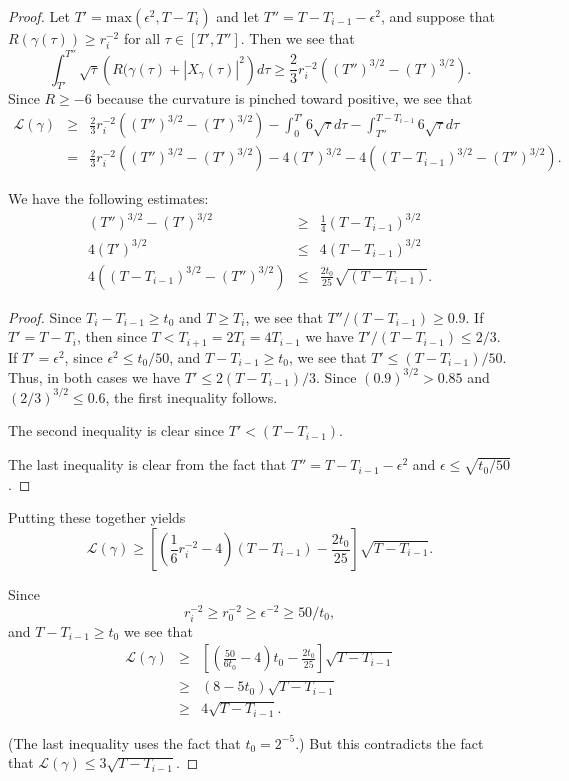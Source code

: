 \begin{proof}
Let $T'=\mathrm{max}(\epsilon^{2},T-T_i)$ and let
$T''=T-T_{i-1}-\epsilon^2$, and suppose that $R(\gamma(\tau))\ge
r_i^{-2}$ for all $\tau\in [T',T'']$. Then we see that
$$\int_{T'}^{T''}\sqrt{\tau}\left(R(\gamma(\tau)+|X_\gamma(\tau)|^2\right)d\tau
\ge \frac{2}{3}r_i^{-2}\left((T'')^{3/2}-(T')^{3/2}\right).$$ Since
$R\ge -6$ because the curvature is pinched toward positive, we see that
\begin{eqnarray*}
{\mathcal L}(\gamma) & \ge & \frac{2}{3}r_i^{-2}\left((T'')^{3/2}-(T')^{3/2}\right)-\int_0^{T'}
6\sqrt{\tau}d\tau-\int_{T''}^{T-T_{i-1}}6\sqrt{\tau}d\tau \\
& = & \frac{2}{3}r_i^{-2}\left((T'')^{3/2}-(T')^{3/2}\right)-
4(T')^{3/2}-4\left((T-T_{i-1})^{3/2}-(T'')^{3/2}\right).
\end{eqnarray*}

\begin{claim}
\label{claim:tau0-estimates} We have the following estimates:
\begin{eqnarray*}
(T'')^{3/2}-(T')^{3/2} & \ge &
\frac{1}{4}(T-T_{i-1})^{3/2} \\
4(T')^{3/2} & \le &  4(T-T_{i-1})^{3/2} \\
4\left((T-T_{i-1})^{3/2}-(T'')^{3/2}\right) & \le &
\frac{2t_0}{25}\sqrt{(T-T_{i-1})}.\end{eqnarray*}
\end{claim}

\begin{proof}
Since $T_i-T_{i-1}\ge t_0$ and $T\ge T_i$, we see that
$T''/(T-T_{i-1})\ge 0.9$. If $T'=T-T_i$, then since
$T<T_{i+1}=2T_i=4T_{i-1}$ we have $T'/(T-T_{i-1})\le 2/3$. If
$T'=\epsilon^2$, since $\epsilon^2\le t_0/50$, and $T-T_{i-1}\ge
t_0$, we see that $T'\le (T-T_{i-1})/50$. Thus, in both cases we
have $T'\le 2(T-T_{i-1})/3$. Since $(0.9)^{3/2}>0.85$ and
$(2/3)^{3/2}\le 0.6$, the first inequality follows.

The second inequality is clear since $T'<(T-T_{i-1})$.

The last inequality is clear from the fact that
$T''=T-T_{i-1}-\epsilon^2$ and $\epsilon\le \sqrt{t_0/50}$.
\end{proof}




 Putting these together yields
 $${\mathcal L}(\gamma)\ge
 \left[\left(\frac{1}{6}r_i^{-2}-4\right)\left(T-T_{i-1}\right)-\frac{2t_0}{25}\right]
 \sqrt{T-T_{i-1}}.$$

Since
$$r_i^{-2}\ge r_0^{-2}\ge \epsilon^{-2}\ge 50/t_0,$$
and $T-T_{i-1}\ge t_0$ we see that \begin{eqnarray*}{\mathcal
L}(\gamma) & \ge &
\left[\left(\frac{50}{6t_0}-4\right)t_0-\frac{2t_0}{25}\right]\sqrt{T-T_{i-1}}
\\
& \ge & (8-5t_0)\sqrt{T-T_{i-1}} \\
& \ge & 4\sqrt{T-T_{i-1}}.
\end{eqnarray*}

(The last inequality uses the fact that $t_0=2^{-5}$.) But this
contradicts the fact that ${\mathcal L}(\gamma)\le
3\sqrt{T-T_{i-1}}$.
\end{proof}




